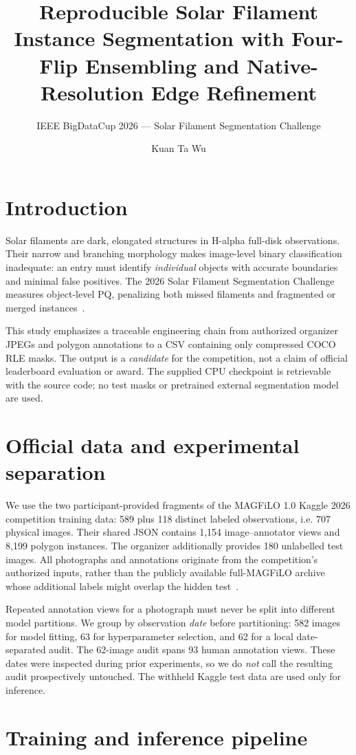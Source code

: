 \documentclass[sigconf,nonacm]{acmart}
\title{Reproducible Solar Filament Instance Segmentation with Four-Flip Ensembling and Native-Resolution Edge Refinement}
\subtitle{IEEE BigDataCup 2026 --- Solar Filament Segmentation Challenge}
\author{Kuan Ta Wu}
\affiliation{\institution{Max Well Apex LLC}\city{New York}\country{USA}}
\begin{document}
\maketitle
\section{Introduction}
Solar filaments are dark, elongated structures in H-alpha full-disk observations. Their narrow and branching morphology makes image-level binary classification inadequate: an entry must identify \emph{individual} objects with accurate boundaries and minimal false positives. The 2026 Solar Filament Segmentation Challenge measures object-level PQ, penalizing both missed filaments and fragmented or merged instances~\cite{contest,kirillov2019panoptic}.

This study emphasizes a traceable engineering chain from authorized organizer JPEGs and polygon annotations to a CSV containing only compressed COCO RLE masks. The output is a \emph{candidate} for the competition, not a claim of official leaderboard evaluation or award. The supplied CPU checkpoint is retrievable with the source code; no test masks or pretrained external segmentation model are used.
\section{Official data and experimental separation}
We use the two participant-provided fragments of the MAGFiLO 1.0 Kaggle 2026 competition training data: 589 plus 118 distinct labeled observations, i.e. 707 physical images. Their shared JSON contains 1,154 image--annotator views and 8,199 polygon instances. The organizer additionally provides 180 unlabelled test images. All photographs and annotations originate from the competition's authorized inputs, rather than the publicly available full-MAGFiLO archive whose additional labels might overlap the hidden test~\cite{magfilo,contest}.

Repeated annotation views for a photograph must never be split into different model partitions. We group by observation \emph{date} before partitioning: 582 images for model fitting, 63 for hyperparameter selection, and 62 for a local date-separated audit. The 62-image audit spans 93 human annotation views. These dates were inspected during prior experiments, so we do \emph{not} call the resulting audit prospectively untouched. The withheld Kaggle test data are used only for inference.

\section{Training and inference pipeline}
\end{document}
